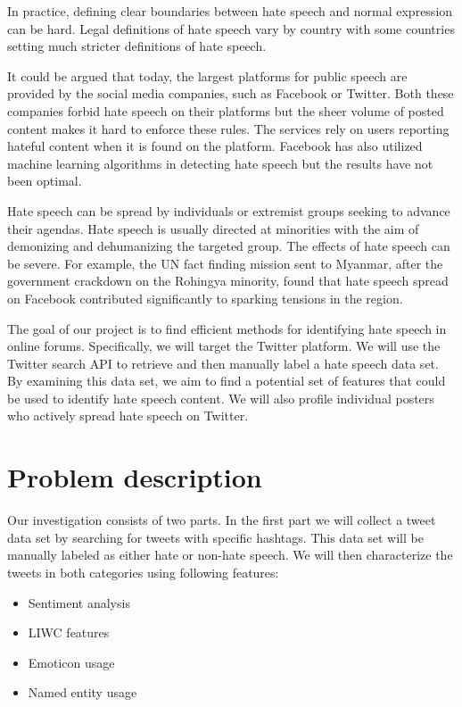 \documentclass[conference]{IEEEtran}
\begin{document}
In practice, defining clear boundaries between hate speech and normal expression can be
hard. Legal definitions of hate speech vary by country with some countries setting much
stricter definitions of hate speech. \cite{Wikipedia:hate_speech_laws}

It could be argued that today, the largest platforms for public speech are provided by 
the social media companies, such as Facebook or Twitter. Both these companies forbid 
hate speech on their platforms \cite{Twitter:hate_speech,Facebook:hate_speech} but the sheer volume 
of posted content makes it hard to enforce these rules. The services rely on users reporting
hateful content when it is found on the platform. Facebook has also utilized machine learning
algorithms in detecting hate speech but the results have not been optimal. \cite{Time:facebook_hate_speech_languages}

Hate speech can be spread by individuals or extremist groups seeking to advance their 
agendas. Hate speech is usually directed at minorities with the aim of demonizing and 
dehumanizing the targeted group. The effects of hate speech can be severe. For example, the 
UN fact finding mission sent to Myanmar, after the government crackdown on the Rohingya 
minority, found that hate speech spread on Facebook contributed significantly to sparking 
tensions in the region\cite{Reuters:myanmar_rohingya}.

The goal of our project is to find efficient methods for identifying hate speech in online forums.
Specifically, we will target the Twitter platform. We will use the Twitter search API to retrieve and then 
manually label a hate speech data set. By examining this data set, we aim to find a potential set of features 
that could be used to identify hate speech content.  We will also profile individual posters who actively spread 
hate speech on Twitter.

\section{Problem description}
Our investigation consists of two parts. In the first part we will collect a tweet data set by searching 
for tweets with specific hashtags. This data set will be manually labeled as either hate or 
non-hate speech. We will then characterize the tweets in both categories using following features:

\begin{itemize}
    \item Sentiment analysis
    \item LIWC features
    \item Emoticon usage
    \item Named entity usage
\end{itemize}
\end{document}
